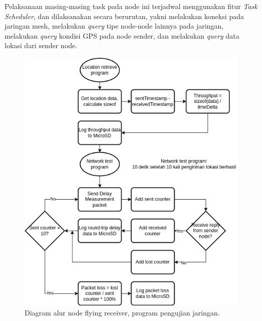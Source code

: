 Pelaksanaan masing-masing task pada node ini terjadwal menggunakan fitur \textit{Task Scheduler}, dan dilaksanakan secara berurutan, yakni melakukan koneksi pada jaringan mesh, melakukan \textit{query} tipe node-node lainnya pada jaringan, melakukan \textit{query} kondisi GPS pada node sender, dan melakukan \textit{query} data lokasi dari sender node.

\begin{figure}[H]
	\centering
	\includegraphics[scale=0.5]{./assets/FlowchartNetworkTest}
	\caption{Diagram alur node flying receiver, program pengujian jaringan.}
\end{figure}

